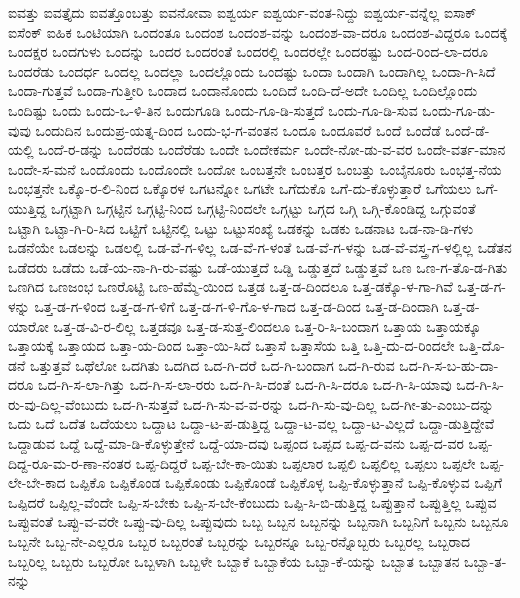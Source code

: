 {ಐವತ್ತು
ಐವತ್ತೈದು
ಐವತ್ತೊಂಬತ್ತು
ಐವನೋವಾ
ಐಶ್ವರ್ಯ
ಐಶ್ವರ್ಯ-ವಂತ-ನಿದ್ದು
ಐಶ್ವರ್ಯ-ವನ್ನೆಲ್ಲ
ಐಸಾಕ್
ಐಸೆಂಕ್
ಐಹಿಕ
ಒಂಟಿಯಾಗಿ
ಒಂದಂತೂ
ಒಂದಂಶ
ಒಂದಂಶ-ವನ್ನು
ಒಂದಂಶ-ವಾ-ದರೂ
ಒಂದಂಶ-ವಿದ್ದರೂ
ಒಂದಕ್ಕೆ
ಒಂದಕ್ಷರ
ಒಂದಗುಳು
ಒಂದನ್ನು
ಒಂದರ
ಒಂದರಂತೆ
ಒಂದರಲ್ಲಿ
ಒಂದರಲ್ಲೇ
ಒಂದರಷ್ಟು
ಒಂದ-ರಿಂದ-ಲಾ-ದರೂ
ಒಂದರೆಡು
ಒಂದರ್ಧ
ಒಂದಲ್ಲ
ಒಂದಲ್ಲಾ
ಒಂದಲ್ಲೊಂದು
ಒಂದಷ್ಟು
ಒಂದಾ
ಒಂದಾಗಿ
ಒಂದಾಗಿಲ್ಲ
ಒಂದಾ-ಗಿ-ಸಿದೆ
ಒಂದಾ-ಗುತ್ತವೆ
ಒಂದಾ-ಗುತ್ತೀರಿ
ಒಂದಾದ
ಒಂದಾನೊಂದು
ಒಂದಿದೆ
ಒಂದಿ-ದೆ-ಅದೇ
ಒಂದಿಲ್ಲ
ಒಂದಿಲ್ಲೊಂದು
ಒಂದಿಷ್ಟು
ಒಂದು
ಒಂದು-ಒ-ಳಿ-ತಿನ
ಒಂದುಗೂಡಿ
ಒಂದು-ಗೂ-ಡಿ-ಸುತ್ತದೆ
ಒಂದು-ಗೂ-ಡಿ-ಸುವ
ಒಂದು-ಗೂ-ಡು-ವುವು
ಒಂದುದಿನ
ಒಂದುಪ್ರ-ಯತ್ನ-ದಿಂದ
ಒಂದು-ಭ-ಗ-ವಂತನ
ಒಂದೂ
ಒಂದೂವರೆ
ಒಂದೆ
ಒಂದೆಡೆ
ಒಂದೆ-ಡೆ-ಯಲ್ಲಿ
ಒಂದೆ-ರ-ಡನ್ನು
ಒಂದೆರಡು
ಒಂದೆರೆಡು
ಒಂದೇ
ಒಂದೇಕರ್ಮ
ಒಂದೇ-ನೋ-ಡು-ವ-ವರ
ಒಂದೇ-ವರ್ತ-ಮಾನ
ಒಂದೇ-ಸ-ಮನೆ
ಒಂದೊಂದು
ಒಂದೊಂದೇ
ಒಂದೋ
ಒಂಬತ್ತನೇ
ಒಂಬತ್ತರ
ಒಂಬತ್ತು
ಒಂಬೈನೂರು
ಒಂಭತ್ತ-ನೆಯ
ಒಂಭತ್ತನೇ
ಒಕ್ಕೊ-ರ-ಲಿ-ನಿಂದ
ಒಕ್ಕೊರಳ
ಒಗಟನ್ನೋ
ಒಗಟೇ
ಒಗೆದುಕೊ
ಒಗೆ-ದು-ಕೊಳ್ಳುತ್ತಾರೆ
ಒಗೆಯಲು
ಒಗೆ-ಯುತ್ತಿದ್ದ
ಒಗ್ಗಟ್ಟಾಗಿ
ಒಗ್ಗಟ್ಟಿನ
ಒಗ್ಗಟ್ಟಿ-ನಿಂದ
ಒಗ್ಗಟ್ಟಿ-ನಿಂದಲೇ
ಒಗ್ಗಟ್ಟು
ಒಗ್ಗದ
ಒಗ್ಗಿ
ಒಗ್ಗಿ-ಕೊಂಡಿದ್ದ
ಒಗ್ಗುವಂತೆ
ಒಟ್ಟಾಗಿ
ಒಟ್ಟಾ-ಗಿ-ರಿ-ಸಿದ
ಒಟ್ಟಿಗೆ
ಒಟ್ಟಿನಲ್ಲಿ
ಒಟ್ಟು
ಒಟ್ಟುಸಂಖ್ಯೆ
ಒಡಕನ್ನು
ಒಡಕು
ಒಡನಾಟ
ಒಡ-ನಾ-ಡಿ-ಗಳು
ಒಡನೆಯೇ
ಒಡಲನ್ನು
ಒಡಲಲ್ಲಿ
ಒಡ-ವೆ-ಗ-ಳಿಲ್ಲ
ಒಡ-ವೆ-ಗ-ಳಂತೆ
ಒಡ-ವೆ-ಗ-ಳನ್ನು
ಒಡ-ವೆ-ವಸ್ತ್ರ-ಗ-ಳಲ್ಲಿಲ್ಲ
ಒಡೆತನ
ಒಡೆದರು
ಒಡೆದು
ಒಡೆ-ಯ-ನಾ-ಗಿ-ರು-ವಷ್ಟು
ಒಡೆ-ಯುತ್ತದೆ
ಒಡ್ಡಿ
ಒಡ್ಡುತ್ತದೆ
ಒಡ್ಡುತ್ತವೆ
ಒಣ
ಒಣ-ಗ-ತೊ-ಡ-ಗಿತು
ಒಣಗಿದ
ಒಣಜಂಭ
ಒಣರೊಟ್ಟಿ
ಒಣ-ಹೆಮ್ಮೆ-ಯಿಂದ
ಒತ್ತಡ
ಒತ್ತ-ಡ-ದಿಂದಲೂ
ಒತ್ತ-ಡಕ್ಕೊ-ಳ-ಗಾ-ಗಿವೆ
ಒತ್ತ-ಡ-ಗ-ಳನ್ನು
ಒತ್ತ-ಡ-ಗ-ಳಿಂದ
ಒತ್ತ-ಡ-ಗ-ಳಿಗೆ
ಒತ್ತ-ಡ-ಗ-ಳಿ-ಗೊ-ಳ-ಗಾದ
ಒತ್ತ-ಡ-ದಿಂದ
ಒತ್ತ-ಡ-ದಿಂದಾಗಿ
ಒತ್ತ-ಡ-ಯಾರೋ
ಒತ್ತ-ಡ-ವಿ-ರ-ಲಿಲ್ಲ
ಒತ್ತಡವೂ
ಒತ್ತ-ಡ-ಸುತ್ತ-ಲಿಂದಲೂ
ಒತ್ತ-ರಿ-ಸಿ-ಬಂದಾಗ
ಒತ್ತಾಯ
ಒತ್ತಾಯಕ್ಕೂ
ಒತ್ತಾಯಕ್ಕೆ
ಒತ್ತಾಯದ
ಒತ್ತಾ-ಯ-ದಿಂದ
ಒತ್ತಾ-ಯಿ-ಸಿದೆ
ಒತ್ತಾಸೆ
ಒತ್ತಾಸೆಯ
ಒತ್ತಿ
ಒತ್ತಿ-ದು-ದ-ರಿಂದಲೇ
ಒತ್ತಿ-ದೊ-ಡನೆ
ಒತ್ತುತ್ತವೆ
ಒಥೆಲೋ
ಒದಗಿತು
ಒದಗಿದ
ಒದ-ಗಿ-ದರೆ
ಒದ-ಗಿ-ಬಂದಾಗ
ಒದ-ಗಿ-ರುವ
ಒದ-ಗಿ-ಸ-ಬ-ಹು-ದಾ-ದರೂ
ಒದ-ಗಿ-ಸ-ಲಾ-ಗಿತ್ತು
ಒದ-ಗಿ-ಸ-ಲಾ-ರರು
ಒದ-ಗಿ-ಸಿ-ದಂತೆ
ಒದ-ಗಿ-ಸಿ-ದರೂ
ಒದ-ಗಿ-ಸಿ-ಯಾವು
ಒದ-ಗಿ-ಸಿ-ರು-ವು-ದಿಲ್ಲ-ವೆಂಬುದು
ಒದ-ಗಿ-ಸುತ್ತವೆ
ಒದ-ಗಿ-ಸು-ವ-ವ-ರನ್ನು
ಒದ-ಗಿ-ಸು-ವು-ದಿಲ್ಲ
ಒದ-ಗೀ-ತು-ಎಂಬು-ದನ್ನು
ಒದು
ಒದೆ
ಒದೆತ
ಒದೆಯಲು
ಒದ್ದಾಟ
ಒದ್ದಾ-ಟ-ಪ-ಡುತ್ತಿದ್ದ
ಒದ್ದಾ-ಟ-ವಲ್ಲ
ಒದ್ದಾ-ಟ-ವಿಲ್ಲದೆ
ಒದ್ದಾ-ಡುತ್ತಿದ್ದೇವೆ
ಒದ್ದಾಡುವ
ಒದ್ದೆ
ಒದ್ದೆ-ಮಾ-ಡಿ-ಕೊಳ್ಳುತ್ತೇನೆ
ಒದ್ದೆ-ಯಾ-ದವು
ಒಪ್ಪಂದ
ಒಪ್ಪದ
ಒಪ್ಪ-ದ-ವನು
ಒಪ್ಪ-ದ-ವರ
ಒಪ್ಪ-ದಿದ್ದ-ರೂ-ಮ-ರ-ಣಾ-ನಂತರ
ಒಪ್ಪ-ದಿದ್ದರೆ
ಒಪ್ಪ-ಬೇ-ಕಾ-ಯಿತು
ಒಪ್ಪಲಾರ
ಒಪ್ಪಲಿ
ಒಪ್ಪಲಿಲ್ಲ
ಒಪ್ಪಲು
ಒಪ್ಪಲೇ
ಒಪ್ಪ-ಲೇ-ಬೇ-ಕಾದ
ಒಪ್ಪಿಕೊ
ಒಪ್ಪಿಕೊಂಡ
ಒಪ್ಪಿಕೊಂಡು
ಒಪ್ಪಿಕೊಂಡೆ
ಒಪ್ಪಿಕೊಳ್ಳ
ಒಪ್ಪಿ-ಕೊಳ್ಳುತ್ತಾನೆ
ಒಪ್ಪಿ-ಕೊಳ್ಳುವ
ಒಪ್ಪಿಗೆ
ಒಪ್ಪಿದರೆ
ಒಪ್ಪಿಲ್ಲ-ವೆಂದೇ
ಒಪ್ಪಿ-ಸ-ಬೇಕು
ಒಪ್ಪಿ-ಸ-ಬೇ-ಕೆಂಬುದು
ಒಪ್ಪಿ-ಸಿ-ಬಿ-ಡುತ್ತಿದ್ದ
ಒಪ್ಪುತ್ತಾನೆ
ಒಪ್ಪುತ್ತಿಲ್ಲ
ಒಪ್ಪುವ
ಒಪ್ಪುವಂತೆ
ಒಪ್ಪು-ವ-ವರೇ
ಒಪ್ಪು-ವು-ದಿಲ್ಲ
ಒಪ್ಪುವುದು
ಒಬ್ಬ
ಒಬ್ಬನ
ಒಬ್ಬನನ್ನು
ಒಬ್ಬನಾಗಿ
ಒಬ್ಬನಿಗೆ
ಒಬ್ಬನು
ಒಬ್ಬನೂ
ಒಬ್ಬನೇ
ಒಬ್ಬ-ನೇ-ಎಲ್ಲರೂ
ಒಬ್ಬರ
ಒಬ್ಬರಂತೆ
ಒಬ್ಬರನ್ನು
ಒಬ್ಬರನ್ನೂ
ಒಬ್ಬ-ರನ್ನೊಬ್ಬರು
ಒಬ್ಬರಲ್ಲ
ಒಬ್ಬರಾದ
ಒಬ್ಬರಿಲ್ಲ
ಒಬ್ಬರು
ಒಬ್ಬರೋ
ಒಬ್ಬಳಾಗಿ
ಒಬ್ಬಳೇ
ಒಬ್ಬಾಕೆ
ಒಬ್ಬಾಕೆಯ
ಒಬ್ಬಾ-ಕೆ-ಯನ್ನು
ಒಬ್ಬಾತ
ಒಬ್ಬಾತನ
ಒಬ್ಬಾ-ತ-ನನ್ನು
}
